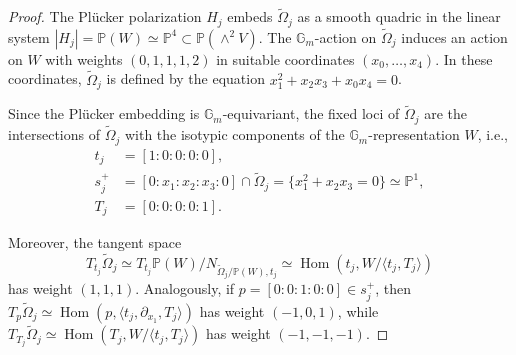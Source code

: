 \documentclass[11pt]{article}
\newcommand{\ie}{i.e.,\xspace}
\theoremstyle{definition}
\newcommand{\Gm}{\mathbb{G}_m}
\newcommand{\PP}{\mathbb{P}}
\newcommand{\Hom}{\operatorname{Hom}}
\newcommand{\tomega}{\widetilde{\Omega}}
\begin{document}
\begin{proof}
The Plücker polarization $H_j$ embeds $\tomega_j$ as a smooth quadric in the linear system $|H_j| = \PP(W) \simeq \mathbb{P}^4 \subset \mathbb{P}(\wedge^2 V)$. The $\Gm$\nobreakdash-action on $\tomega_j$ induces an action on $W$ with weights $(0,1,1,1,2)$ in suitable coordinates $(x_0,\ldots,x_4)$. In these coordinates, $\tomega_j$ is defined by the equation $x_1^2+x_2x_3+x_0x_4=0$.

Since the Plücker embedding is $\Gm$\nobreakdash-equivariant, the fixed loci of $\tomega_j$ are the intersections of $\tomega_j$ with the isotypic components of the $\Gm$\nobreakdash-representation $W$, \ie
\begin{align*}
t_j & =[1:0:0:0:0],\\
s_j^+& = [0:x_1:x_2:x_3:0] \cap \tomega_j = \{x_1^2+x_2x_3 =0\}\simeq \PP^1,\\
T_j & = [0:0:0:0:1].
\end{align*}

Moreover, the tangent space
\[
T_{t_j}\tomega_j \simeq T_{t_j}\PP(W)/N_{\tomega_j/\PP(W), t_j} \simeq \Hom(t_j, W/\langle t_j, T_j\rangle)
\]
has weight $(1,1,1)$. Analogously, if $p = [0:0:1:0:0] \in s^{+}_j$, then
$
T_{p}\tomega_j \simeq \Hom(p, \langle t_j, \partial_{x_1}, T_j\rangle)
$
has weight $(-1,0,1)$, while $T_{T_j}\tomega_j \simeq \Hom(T_j, W/\langle t_j, T_j\rangle)$ has weight $(-1,-1,-1)$.
\end{proof}
\end{document}
